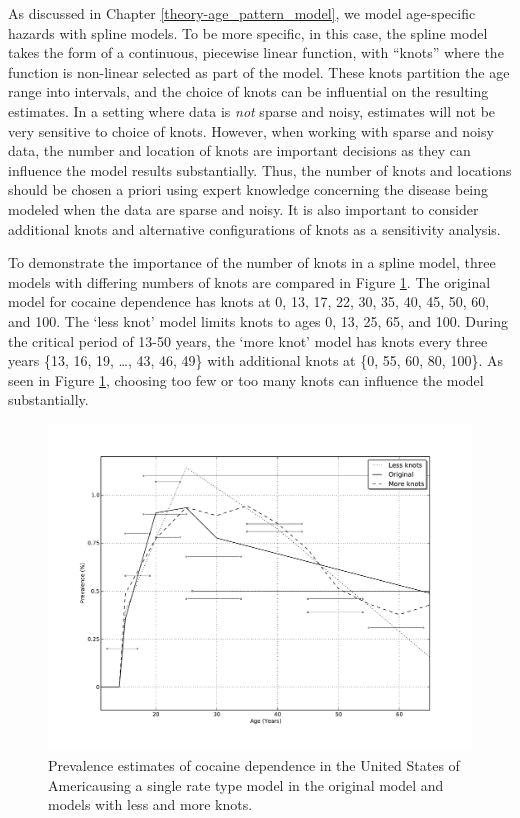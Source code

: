 As discussed in Chapter \ref{theory-age_pattern_model}, we model
age-specific hazards with spline models.  To be more specific, in this
case, the spline model takes the form of a continuous, piecewise
linear function, with ``knots'' where the function is non-linear
selected as part of the model.  These knots partition the age range
into intervals, and the choice of knots can be influential on the
resulting estimates.  In a setting where data is \emph{not} sparse and
noisy, estimates will not be very sensitive to choice of knots.
However, when working with sparse and noisy data, the number and
location of knots are important decisions as they can influence the
model results substantially.  Thus, the number of knots and locations
should be chosen a priori using expert knowledge concerning the
disease being modeled when the data are sparse and noisy.  It is also
important to consider additional knots and alternative configurations
of knots as a sensitivity analysis.

To demonstrate the importance of the number of knots in a spline
model, three models with differing numbers of knots are compared in
Figure \ref{fig:app-cocaine_knots}.  The original model for cocaine
dependence has knots at 0, 13, 17, 22, 30, 35, 40, 45, 50, 60, and
100.  The `less knot' model limits knots to ages 0, 13, 25, 65, and
100.  During the critical period of 13-50 years, the `more knot' model
has knots every three years \{13, 16, 19, \ldots, 43, 46, 49\} with
additional knots at \{0, 55, 60, 80, 100\}.  As seen in Figure
\ref{fig:app-cocaine_knots}, choosing too few or too many knots can
influence the model substantially.

    \begin{figure}[h]
        \begin{center}
            \includegraphics[width=\textwidth]{applications/cocaine_dependence-knots.pdf}
            \caption{Prevalence estimates of cocaine dependence in the United
              States of Americausing a single rate type model in the original
              model and models with less and more knots. }
        \label{fig:app-cocaine_knots}
        \end{center}
    \end{figure}

